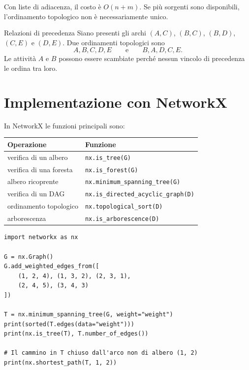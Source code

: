 \documentclass[11pt,a4paper]{article}
\begin{document}
Con liste di adiacenza, il costo è $O(n+m)$. Se più sorgenti sono disponibili, l'ordinamento topologico non è necessariamente unico.

\begin{examplebox}{Relazioni di precedenza}
Siano presenti gli archi $(A,C)$, $(B,C)$, $(B,D)$, $(C,E)$ e $(D,E)$. Due ordinamenti topologici sono
\[
A,B,C,D,E \qquad\text{e}\qquad B,A,D,C,E.
\]
Le attività $A$ e $B$ possono essere scambiate perché nessun vincolo di precedenza le ordina tra loro.
\end{examplebox}

\section{Implementazione con NetworkX}

\begin{networkxbox}
In NetworkX le funzioni principali sono:
\begin{center}
\begin{tabular}{ll}
\toprule
Operazione & Funzione\\
\midrule
verifica di un albero & \texttt{nx.is\_tree(G)}\\
verifica di una foresta & \texttt{nx.is\_forest(G)}\\
albero ricoprente & \texttt{nx.minimum\_spanning\_tree(G)}\\
verifica di un DAG & \texttt{nx.is\_directed\_acyclic\_graph(D)}\\
ordinamento topologico & \texttt{nx.topological\_sort(D)}\\
arborescenza & \texttt{nx.is\_arborescence(D)}\\
\bottomrule
\end{tabular}
\end{center}
\end{networkxbox}

\begin{lstlisting}[style=python,caption={Albero ricoprente e scambio fondamentale}]
import networkx as nx

G = nx.Graph()
G.add_weighted_edges_from([
    (1, 2, 4), (1, 3, 2), (2, 3, 1),
    (2, 4, 5), (3, 4, 3)
])

T = nx.minimum_spanning_tree(G, weight="weight")
print(sorted(T.edges(data="weight")))
print(nx.is_tree(T), T.number_of_edges())

# Il cammino in T chiuso dall'arco non di albero (1, 2)
print(nx.shortest_path(T, 1, 2))
\end{lstlisting}
\end{document}
